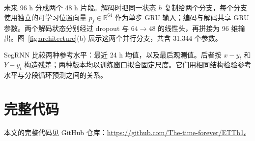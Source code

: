 \documentclass[UTF8,a4paper,11pt,fontset=windows]{ctexart}
\begin{document}
未来 96 h 分成两个 48 h 片段。解码时把同一状态 $h$ 复制给两个分支，每个分支使用独立的可学习位置向量 $p_j\in\mathbb R^{64}$ 作为单步 GRU 输入；编码与解码共享 GRU 参数。两个解码状态分别经过 dropout 与 $64\to48$ 的线性头，再拼接为 96 维输出。图~\ref{fig:architecture}(b) 展示这两个并行分支，共含 31,344 个参数。

SegRNN 比较两种参考水平：最近 24 h 均值，以及最后观测值。后者按 $x-y_t$ 和 $Y-y_t$ 构造残差；两种版本均以训练窗口拟合固定尺度。它们用相同结构检验参考水平与分段循环预测之间的关系。

\FloatBarrier
\section{完整代码}
本文的完整代码见 GitHub 仓库：\url{https://github.com/The-time-forever/ETTh1}。
\end{document}
